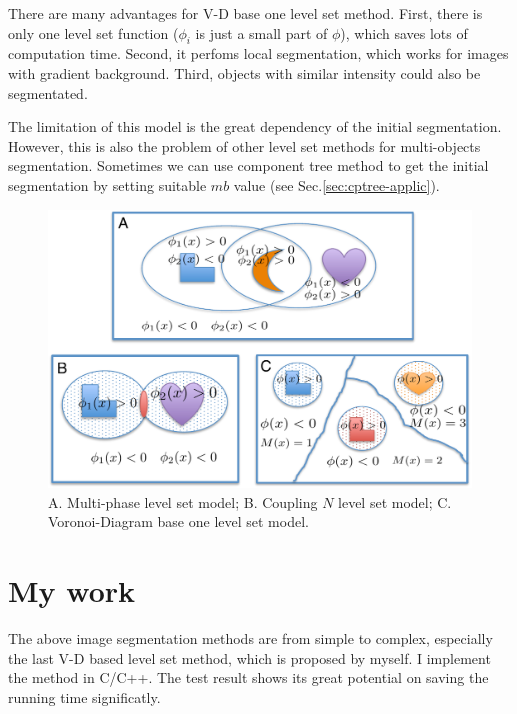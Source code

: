 There are many advantages for V-D base one level set method. First, there is only one level set function ($\phi_i$ is just a small part of $\phi$), which saves lots of computation time. Second, it perfoms local segmentation, which works for images with gradient background. Third, objects with similar intensity could also be segmentated.

The limitation of this model is the great dependency of the initial segmentation. However, this is also the problem of other level set methods for multi-objects segmentation. Sometimes we can use component tree method to get the initial segmentation by setting suitable $mb$ value (see Sec.\ref{sec:cptree-applic}).

\begin{figure}[htbp]
\centering
\includegraphics[width=1.0\textwidth]{images/imgseg_multiobjs}
\caption[The level set model of multi-objects segmentation]{A. Multi-phase level set model; B. Coupling $N$ level set model; C. Voronoi-Diagram base one level set model.}
\label{fig:imgseg-multiobjs}
\end{figure}
\section{My work}
The above image segmentation methods are from simple to complex, especially the last V-D based level set method, which is proposed by myself. I implement the method in C/C++. The test result shows its great potential on saving the running time significatly.
